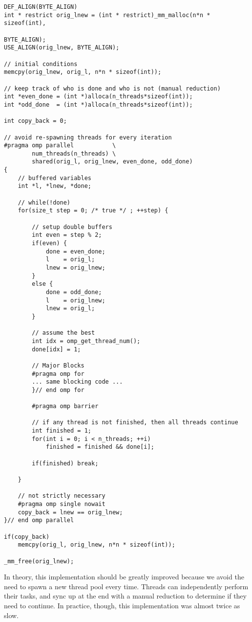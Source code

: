 \documentclass[11pt]{article}
\begin{document}
\begin{lstlisting}
DEF_ALIGN(BYTE_ALIGN)
int * restrict orig_lnew = (int * restrict)_mm_malloc(n*n * sizeof(int),
	                                                        BYTE_ALIGN);
USE_ALIGN(orig_lnew, BYTE_ALIGN);

// initial conditions
memcpy(orig_lnew, orig_l, n*n * sizeof(int));

// keep track of who is done and who is not (manual reduction)
int *even_done = (int *)alloca(n_threads*sizeof(int));
int *odd_done  = (int *)alloca(n_threads*sizeof(int));

int copy_back = 0;

// avoid re-spawning threads for every iteration
#pragma omp parallel           \
        num_threads(n_threads) \
        shared(orig_l, orig_lnew, even_done, odd_done)
{
    // buffered variables
    int *l, *lnew, *done;

    // while(!done)
    for(size_t step = 0; /* true */ ; ++step) {
        
        // setup double buffers
        int even = step % 2;
        if(even) {
            done = even_done;
            l    = orig_l;
            lnew = orig_lnew;
        }
        else {
            done = odd_done;
            l    = orig_lnew;
            lnew = orig_l;
        }

        // assume the best
        int idx = omp_get_thread_num();
        done[idx] = 1;

        // Major Blocks
        #pragma omp for
        ... same blocking code ...
    	}// end omp for

        #pragma omp barrier

        // if any thread is not finished, then all threads continue
        int finished = 1;
        for(int i = 0; i < n_threads; ++i)
            finished = finished && done[i];

        if(finished) break;

    }

    // not strictly necessary
    #pragma omp single nowait
    copy_back = lnew == orig_lnew;
}// end omp parallel

if(copy_back)
    memcpy(orig_l, orig_lnew, n*n * sizeof(int));

_mm_free(orig_lnew);
\end{lstlisting}

\noindent In theory, this implementation should be greatly improved because we avoid the need to spawn a new thread pool every time.  Threads can independently perform their tasks, and sync up at the end with a manual reduction to determine if they need to continue.  In practice, though, this implementation was almost twice as slow.\\
\end{document}
